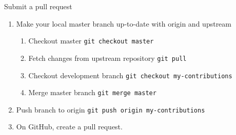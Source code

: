 \documentclass[presentation,aspectratio=1610]{beamer}
\begin{document}
\begin{frame}[fragile,label=sec-4-5]{Submit a pull request}
 \begin{enumerate}
\item Make your local master branch up-to-date with origin and upstream
\begin{enumerate}
\item Checkout master \texttt{git checkout master}
\item Fetch changes from upstream repository \texttt{git pull}
\item Checkout development branch \texttt{git checkout my-contributions}
\item Merge master branch \texttt{git merge master}
\end{enumerate}
\item Push branch to origin \texttt{git push origin my-contributions}
\item On GitHub, create a pull request.
\end{enumerate}
\end{frame}
\end{document}
